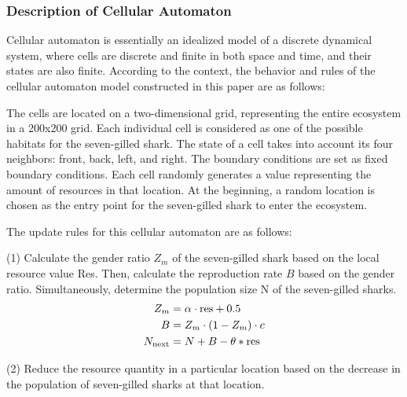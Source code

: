 \documentclass[CTeX = true]{mcmthesis}  %
\begin{document}
\subsubsection{Description of Cellular Automaton}

Cellular automaton is essentially an idealized model of a discrete dynamical system, where cells are discrete and finite in both space and time, and their states are also finite. According to the context, the behavior and rules of the cellular automaton model constructed in this paper are as follows:

The cells are located on a two-dimensional grid, representing the entire ecosystem in a 200x200 grid. Each individual cell is considered as one of the possible habitats for the seven-gilled shark. The state of a cell takes into account its four neighbors: front, back, left, and right. The boundary conditions are set as fixed boundary conditions. Each cell randomly generates a value representing the amount of resources in that location. At the beginning, a random location is chosen as the entry point for the seven-gilled shark to enter the ecosystem.

The update rules for this cellular automaton are as follows:

(1) Calculate the gender ratio $Z_m$ of the seven-gilled shark based on the local resource value Res. Then, calculate the reproduction rate $B$ based on the gender ratio. Simultaneously, determine the population size N of the seven-gilled sharks.
\begin{equation}
\begin{aligned} 
Z_m &= \alpha \cdot {\rm res} + 0.5 \\
B &= Z_m \cdot (1 - Z_m) \cdot c \\
N_{\rm next} &= N + B - \theta * {\rm res}\\
\end{aligned}
\end{equation}

(2) Reduce the resource quantity in a particular location based on the decrease in the population of seven-gilled sharks at that location.
\end{document}
